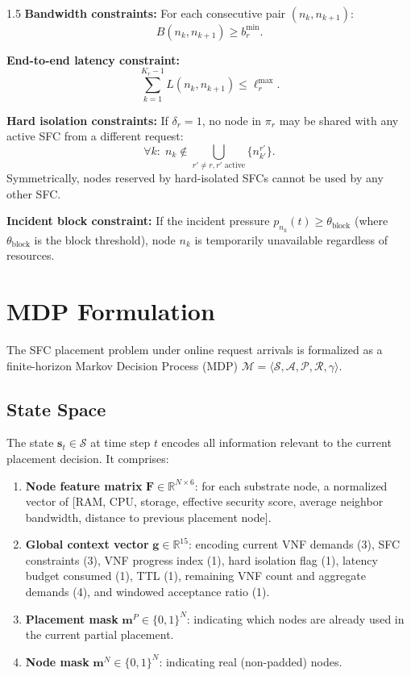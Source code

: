 \documentclass[A4paper,12pt]{report}
\theoremstyle{plain}
\theoremstyle{definition}
\theoremstyle{remark}
\numberwithin{equation}{section}
\begin{document}
\begin{spacing}{1.5}
\textbf{Bandwidth constraints:} For each consecutive pair $(n_k, n_{k+1})$:
\begin{equation}
B(n_k, n_{k+1}) \geq b_r^{\min}.
\end{equation}

\textbf{End-to-end latency constraint:}
\begin{equation}
\sum_{k=1}^{K_r - 1} L(n_k, n_{k+1}) \leq \ell_r^{\max}.
\end{equation}

\textbf{Hard isolation constraints:} If $\delta_r = 1$, no node in $\pi_r$ may be shared with any active SFC from a different request:
\begin{equation}
\forall k:\; n_k \notin \bigcup_{r' \neq r, r' \text{ active}} \{n_{k'}^{r'}\}.
\end{equation}
Symmetrically, nodes reserved by hard-isolated SFCs cannot be used by any other SFC.

\textbf{Incident block constraint:} If the incident pressure $p_{n_k}(t) \geq \theta_{\text{block}}$ (where $\theta_{\text{block}}$ is the block threshold), node $n_k$ is temporarily unavailable regardless of resources.

\section{MDP Formulation}

The SFC placement problem under online request arrivals is formalized as a finite-horizon Markov Decision Process (MDP) $\mathcal{M} = \langle \mathcal{S}, \mathcal{A}, \mathcal{P}, \mathcal{R}, \gamma \rangle$.

\subsection{State Space}

The state $\mathbf{s}_t \in \mathcal{S}$ at time step $t$ encodes all information relevant to the current placement decision. It comprises:

\begin{enumerate}
  \item \textbf{Node feature matrix} $\mathbf{F} \in \mathbb{R}^{N \times 6}$: for each substrate node, a normalized vector of [RAM, CPU, storage, effective security score, average neighbor bandwidth, distance to previous placement node].
  \item \textbf{Global context vector} $\mathbf{g} \in \mathbb{R}^{15}$: encoding current VNF demands (3), SFC constraints (3), VNF progress index (1), hard isolation flag (1), latency budget consumed (1), TTL (1), remaining VNF count and aggregate demands (4), and windowed acceptance ratio (1).
  \item \textbf{Placement mask} $\mathbf{m}^{P} \in \{0,1\}^{N}$: indicating which nodes are already used in the current partial placement.
  \item \textbf{Node mask} $\mathbf{m}^{N} \in \{0,1\}^{N}$: indicating real (non-padded) nodes.
\end{enumerate}


\end{spacing}
\end{document}

